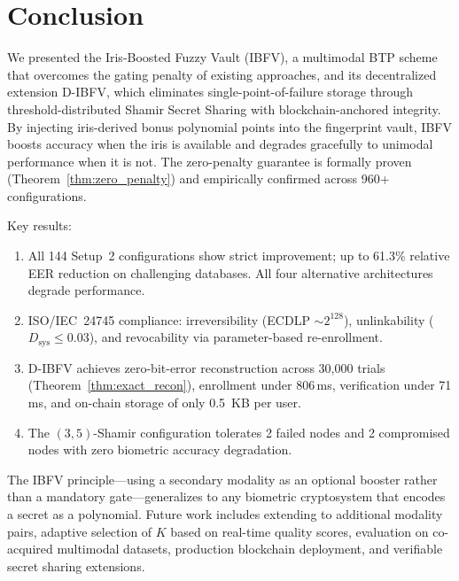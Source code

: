 \documentclass[3p,twocolumn]{elsarticle}
\newcommand{\IBFV}{\textsf{IBFV}}
\newcommand{\DIBFV}{\textsf{D-IBFV}}
\begin{document}
\section{Conclusion}
\label{sec:conclusion}

We presented the Iris-Boosted Fuzzy Vault (\IBFV{}), a multimodal BTP scheme that overcomes the gating penalty of existing approaches, and its decentralized extension \DIBFV{}, which eliminates single-point-of-failure storage through threshold-distributed Shamir Secret Sharing with blockchain-anchored integrity. By injecting iris-derived bonus polynomial points into the fingerprint vault, \IBFV{} boosts accuracy when the iris is available and degrades gracefully to unimodal performance when it is not. The zero-penalty guarantee is formally proven (Theorem~\ref{thm:zero_penalty}) and empirically confirmed across 960+ configurations.

Key results:
\begin{enumerate}
    \item All 144 Setup~2 configurations show strict improvement; up to 61.3\% relative EER reduction on challenging databases. All four alternative architectures degrade performance.
    \item ISO/IEC~24745 compliance: irreversibility (ECDLP $\sim\!2^{128}$), unlinkability ($D_{\text{sys}} \leq 0.03$), and revocability via parameter-based re-enrollment.
    \item \DIBFV{} achieves zero-bit-error reconstruction across 30{,}000 trials (Theorem~\ref{thm:exact_recon}), enrollment under 806\,ms, verification under 71\,ms, and on-chain storage of only 0.5~KB per user.
    \item The $(3,5)$-Shamir configuration tolerates 2 failed nodes and 2 compromised nodes with zero biometric accuracy degradation.
\end{enumerate}

The \IBFV{} principle---using a secondary modality as an optional booster rather than a mandatory gate---generalizes to any biometric cryptosystem that encodes a secret as a polynomial. Future work includes extending to additional modality pairs, adaptive selection of $K$ based on real-time quality scores, evaluation on co-acquired multimodal datasets, production blockchain deployment, and verifiable secret sharing extensions.



\end{document}
